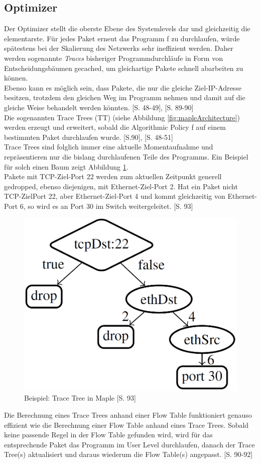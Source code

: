 \documentclass[10pt,conference]{IEEEtran}
\begin{document}
\subsection{Optimizer}
Der Optimizer stellt die oberste Ebene des Systemlevels dar und gleichzeitig die elementarste. Für jedes Paket erneut das Programm f zu durchlaufen, würde spätestens bei der Skalierung des Netzwerks sehr ineffizient werden. Daher werden sogenannte \textit{Traces} bisheriger Programmdurchläufe in Form von Entscheidungsbäumen gecached, um gleichartige Pakete schnell abarbeiten zu können. \\
Ebenso kann es möglich sein, dass Pakete, die nur die gleiche Ziel-IP-Adresse besitzen, trotzdem den gleichen Weg im Programm nehmen und damit auf die gleiche Weise behandelt werden könnten. \cite{10}[S. 48-49], \cite{7}[S. 89-90]\\
Die sogenannten Trace Trees (TT) (siehe Abbildung \ref{fig:mapleArchitecture}) werden erzeugt und erweitert, sobald die Algorithmic Policy f auf einem bestimmten Paket durchlaufen wurde. \cite{7}[S.90], \cite{10}[S. 48-51]\\
Trace Trees sind folglich immer eine aktuelle Momentaufnahme und repräsentieren nur die bislang durchlaufenen Teile des Programms. Ein Beispiel für solch einen Baum zeigt Abbildung \ref{fig:mapleTraceTree}.\\
Pakete mit TCP-Ziel-Port 22 werden zum aktuellen Zeitpunkt generell gedropped, ebenso diejenigen, mit Ethernet-Ziel-Port 2. Hat ein Paket nicht TCP-ZielPort 22, aber Ethernet-Ziel-Port 4 und kommt gleichzeitig von Ethernet-Port 6, so wird es an Port 30 im Switch weitergeleitet. \cite{7}[S. 93]
\begin{figure}[h]
	\centering
	\includegraphics[width=0.5\columnwidth]{images/mapleTraceTree.PNG}
	\caption{Beispiel: Trace Tree in Maple \cite{7}[S. 93]}
	\label{fig:mapleTraceTree}
\end{figure}
\newline
Die Berechnung eines Trace Trees anhand einer Flow Table funktioniert genauso effizient wie die Berechnung einer Flow Table anhand eines Trace Trees. Sobald keine passende Regel in der Flow Table gefunden wird, wird für das entsprechende Paket das Programm im User Level durchlaufen, danach der Trace Tree(s) aktualisiert und daraus wiederum die Flow Table(s) angepasst. \cite{7}[S. 90-92]\\
\end{document}
